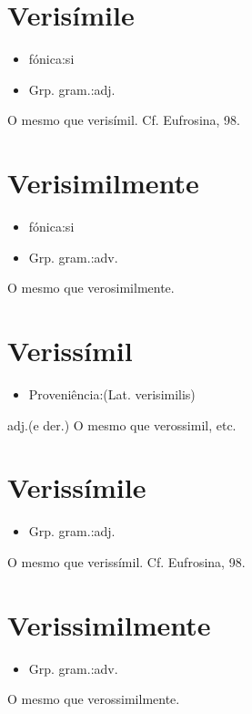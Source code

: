 \documentclass{article}
\begin{document}
\section{Verisímile}
\begin{itemize}
\item {fónica:si}
\end{itemize}
\begin{itemize}
\item {Grp. gram.:adj.}
\end{itemize}
O mesmo que \textunderscore verisímil\textunderscore . Cf. \textunderscore Eufrosina\textunderscore , 98.
\section{Verisimilmente}
\begin{itemize}
\item {fónica:si}
\end{itemize}
\begin{itemize}
\item {Grp. gram.:adv.}
\end{itemize}
O mesmo que \textunderscore verosimilmente\textunderscore .
\section{Verissímil}
\begin{itemize}
\item {Proveniência:(Lat. \textunderscore verisimilis\textunderscore )}
\end{itemize}
\textunderscore adj.\textunderscore  (e der.)
O mesmo que \textunderscore verossimil\textunderscore , etc.
\section{Verissímile}
\begin{itemize}
\item {Grp. gram.:adj.}
\end{itemize}
O mesmo que \textunderscore verissímil\textunderscore . Cf. \textunderscore Eufrosina\textunderscore , 98.
\section{Verissimilmente}
\begin{itemize}
\item {Grp. gram.:adv.}
\end{itemize}
O mesmo que \textunderscore verossimilmente\textunderscore .
\end{document}
